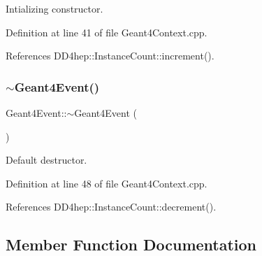 Intializing constructor. 



Definition at line 41 of file Geant4\+Context.\+cpp.



References D\+D4hep\+::\+Instance\+Count\+::increment().

\hypertarget{class_d_d4hep_1_1_simulation_1_1_geant4_event_ab98455cace8f9234b238e350c2299fd0}{}\label{class_d_d4hep_1_1_simulation_1_1_geant4_event_ab98455cace8f9234b238e350c2299fd0} 
\subsubsection{\texorpdfstring{$\sim$\+Geant4\+Event()}{~Geant4Event()}}
{\footnotesize\ttfamily Geant4\+Event\+::$\sim$\+Geant4\+Event (\begin{DoxyParamCaption}{ }\end{DoxyParamCaption})\hspace{0.3cm}{\ttfamily [virtual]}}



Default destructor. 



Definition at line 48 of file Geant4\+Context.\+cpp.



References D\+D4hep\+::\+Instance\+Count\+::decrement().



\subsection{Member Function Documentation}
\hypertarget{class_d_d4hep_1_1_simulation_1_1_geant4_event_aee3baf75d103ea5fbb2e59230392c5d1}{}\label{class_d_d4hep_1_1_simulation_1_1_geant4_event_aee3baf75d103ea5fbb2e59230392c5d1} 
